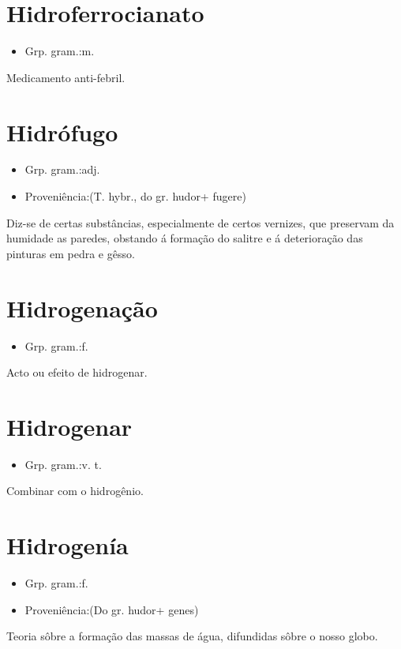 \documentclass{article}
\begin{document}
\section{Hidroferrocianato}
\begin{itemize}
\item {Grp. gram.:m.}
\end{itemize}
Medicamento anti-febril.
\section{Hidrófugo}
\begin{itemize}
\item {Grp. gram.:adj.}
\end{itemize}
\begin{itemize}
\item {Proveniência:(T. hybr., do gr. \textunderscore hudor\textunderscore  + \textunderscore fugere\textunderscore )}
\end{itemize}
Diz-se de certas substâncias, especialmente de certos vernizes, que preservam da humidade as paredes, obstando á formação do salitre e á deterioração das pinturas em pedra e gêsso.
\section{Hidrogenação}
\begin{itemize}
\item {Grp. gram.:f.}
\end{itemize}
Acto ou efeito de hidrogenar.
\section{Hidrogenar}
\begin{itemize}
\item {Grp. gram.:v. t.}
\end{itemize}
Combinar com o hidrogênio.
\section{Hidrogenía}
\begin{itemize}
\item {Grp. gram.:f.}
\end{itemize}
\begin{itemize}
\item {Proveniência:(Do gr. \textunderscore hudor\textunderscore  + \textunderscore genes\textunderscore )}
\end{itemize}
Teoria sôbre a formação das massas de água, difundidas sôbre o nosso globo.
\end{document}
